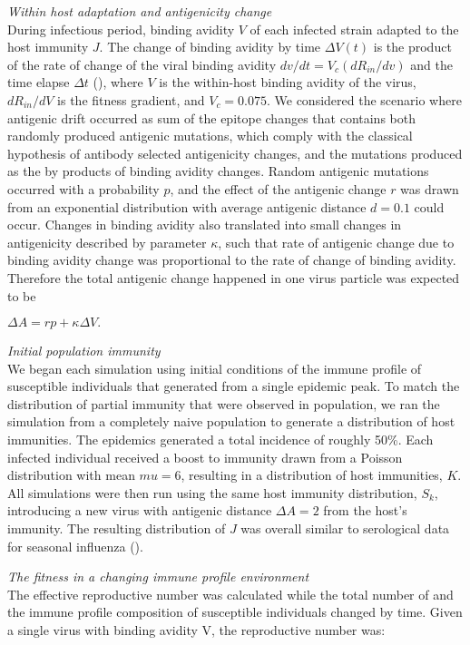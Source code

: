 \documentclass[12pt,a4paper]{article}
\begin{document}
\textit{Within host adaptation and antigenicity change} \\
During infectious period, binding avidity $V$ of each infected strain adapted to the host immunity $J$. The change of binding avidity by time $\Delta V(t)$ is the product of the rate of change of the viral binding avidity $dv/dt =V_{c}(dR_{in}/dv)$ and the time elapse $\Delta t$ (\cite{Yuan2013}), where $V$ is the within-host binding avidity of the virus, $dR_{in}/dV$ is the fitness gradient, and $V_{c}=0.075$. We considered the scenario where antigenic drift occurred as sum of the epitope changes that contains both randomly produced antigenic mutations, which comply with the classical hypothesis of antibody selected antigenicity changes, and the mutations produced as the by products of binding avidity changes. Random antigenic mutations occurred with a probability $p$, and the effect of the antigenic change $r$ was drawn from an exponential distribution with average antigenic distance $d=0.1$ could occur. Changes in binding avidity also translated into small changes in antigenicity described by parameter $\kappa$, such that rate of antigenic change due to binding avidity change was proportional to the rate of change of binding avidity. Therefore the total antigenic change happened in one virus particle was expected to be

$\Delta A=rp+\kappa \Delta V.$

\textit{Initial population immunity} \\
We began each simulation using initial conditions of the immune profile of susceptible individuals that generated from a single epidemic peak. To match the distribution of partial immunity that were observed in population, we ran the simulation from a completely naive population to generate a distribution of host immunities. The epidemics generated a total incidence of roughly 50\%. Each infected individual received a boost to immunity drawn from a Poisson distribution with mean $mu=6$, resulting in a distribution of host immunities, $K$. All simulations were then run using the same host immunity distribution, $S_{k}$, introducing a new virus with antigenic distance $\Delta A=2$ from the host’s immunity. The resulting distribution of $J$ was overall similar to serological data for seasonal influenza (\cite{Yuan2016}).

\textit{The fitness in a changing immune profile environment} \\
The effective reproductive number was calculated while the total number of and the immune profile composition of susceptible individuals changed by time. Given a single virus with binding avidity V, the reproductive number was:
\end{document}
